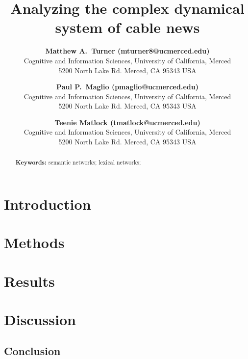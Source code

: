 \documentclass[11pt,letterpaper]{article}
\title{Analyzing the complex dynamical system of cable news}
\author{{\large \bf Matthew A.~Turner (mturner8@ucmerced.edu)} \\
  Cognitive and Information Sciences, University of California, Merced \\
  5200 North Lake Rd. Merced, CA 95343 USA
  \and {\large \bf Paul P.~Maglio (pmaglio@ucmerced.edu)} \\
  Cognitive and Information Sciences, University of California, Merced \\
  5200 North Lake Rd. Merced, CA 95343 USA
  \and
  {\large \bf Teenie Matlock (tmatlock@ucmerced.edu)} \\
  Cognitive and Information Sciences, University of California, Merced \\
  5200 North Lake Rd. Merced, CA 95343 USA
}
\begin{document}
\maketitle


\begin{abstract}


\textbf{Keywords:}
semantic networks; lexical networks; 
\end{abstract}

\section{Introduction}



\section{Methods}
\label{sec:Methods}

%

\section{Results}
\label{sec:Results}



\section{Discussion}

\subsection{Conclusion}



\setlength{\bibleftmargin}{.125in}
\setlength{\bibindent}{-\bibleftmargin}


\end{document}
